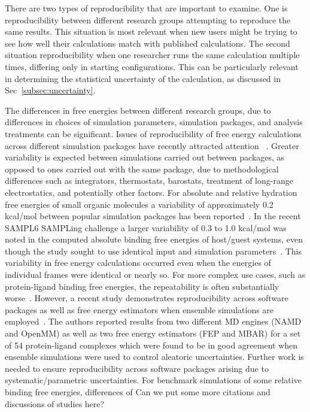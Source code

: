 \documentclass[9pt,bestpractices]{livecoms}
\begin{document}
There are two types of reproducibility that are important to examine.  One is reproducibility between different research groups attempting to reproduce the same results. This situation is most relevant when new users might be trying to see how well their calculations match with published calculations. The second situation reproducibility when one researcher runs the same calculation multiple times, differing only in starting configurations.  This can be particularly relevant in determining the statistical uncertainty of the calculation, as discussed in Sec~\ref{subsec:uncertainty}.


The differences in free energies between different research groups, due to differences in choices of simulation parameters, simulation packages, and analysis treatments can be significant. Issues of reproducibility of free energy calculations across different simulation packages have recently attracted attention ~\cite{loeffler2018reproducibility,rizzi2019sampl6, wade2022, herz2025modular}. Greater variability is expected between simulations carried out between packages, as opposed to ones carried out with the same package, due to methodological differences such as integrators, thermostats, barostats, treatment of long-range electrostatics, and potentially other factors. For absolute and relative hydration free energies of small organic molecules a variability of approximately 0.2 kcal/mol between popular simulation packages has been reported~\cite{loeffler2018reproducibility}. In the recent SAMPL6 SAMPLing challenge a larger variability of 0.3 to 1.0 kcal/mol was noted in the computed absolute binding free energies of host/guest systems, even though the study sought to use identical input and simulation parameters~\cite{rizzi2019sampl6}. This variability in free energy calculations occurred even when the energies of individual frames were identical or nearly so.  For more complex use cases, such as protein-ligand binding free energies, the repeatability is often substantially worse~\cite{rizzi2019sampl6, wade2022}. 
However, a recent study demonstrates reproducibility across software packages as well as free energy estimators when ensemble simulations are employed~\cite{wade2022}. The authors reported results from two different MD engines (NAMD and OpenMM) as well as two free energy estimators (FEP and MBAR) for a set of 54 protein-ligand complexes which were found to be in good agreement when ensemble simulations were used to control aleatoric uncertainties. Further work is needed to ensure reproducibility across software packages arising due to systematic/parametric uncertainties. 
For benchmark simulations of some relative binding free energies, differences of {\color{red}Can we put some more citations and discussions of studies here?} 
\end{document}
